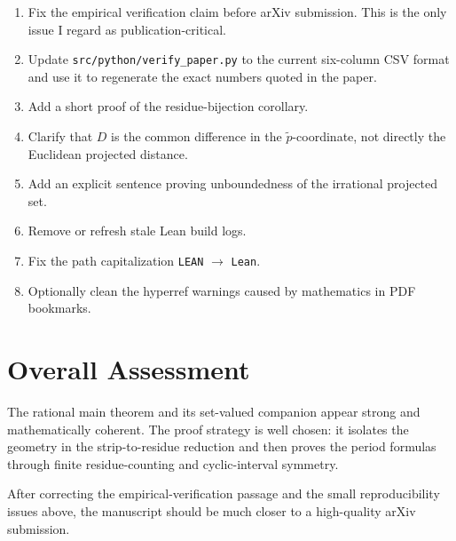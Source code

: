 \documentclass[11pt]{article}
\begin{document}
\begin{enumerate}[leftmargin=*]

\item Fix the empirical verification claim before arXiv submission.  This is
the only issue I regard as publication-critical.

\item Update \texttt{src/python/verify\_paper.py} to the current six-column
CSV format and use it to regenerate the exact numbers quoted in the paper.

\item Add a short proof of the residue-bijection corollary.

\item Clarify that \(D\) is the common difference in the \(\tilde p\)-coordinate,
not directly the Euclidean projected distance.

\item Add an explicit sentence proving unboundedness of the irrational
projected set.

\item Remove or refresh stale Lean build logs.

\item Fix the path capitalization \texttt{LEAN} \(\to\) \texttt{Lean}.

\item Optionally clean the hyperref warnings caused by mathematics in PDF
bookmarks.

\end{enumerate}

\section*{Overall Assessment}

The rational main theorem and its set-valued companion appear strong and
mathematically coherent.  The proof strategy is well chosen: it isolates the
geometry in the strip-to-residue reduction and then proves the period
formulas through finite residue-counting and cyclic-interval symmetry.

After correcting the empirical-verification passage and the small
reproducibility issues above, the manuscript should be much closer to a
high-quality arXiv submission.
\end{document}
